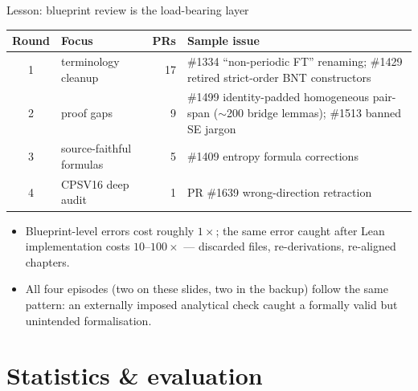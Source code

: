 \documentclass[aspectratio=169,10pt]{beamer}
\begin{document}
\begin{frame}{Lesson: blueprint review is the load-bearing layer}
    \vspace{-0.2em}
    \begin{center}
    \renewcommand{\arraystretch}{1.25}
    {\footnotesize
    \begin{tabular}{@{}c l r l@{}}
        \toprule
        \textbf{Round} & \textbf{Focus} & \textbf{PRs} & \textbf{Sample issue} \\
        \midrule
        1 & terminology cleanup       & 17 & \#1334 ``non-periodic FT'' renaming; \#1429 retired strict-order BNT constructors \\
        2 & proof gaps                & 9  & \#1499 identity-padded homogeneous pair-span ($\sim$200 bridge lemmas); \#1513 banned SE jargon \\
        3 & source-faithful formulas  & 5  & \#1409 entropy formula corrections \\
        4 & CPSV16 deep audit         & 1  & PR \#1639 wrong-direction retraction \\
        \bottomrule
    \end{tabular}}
    \end{center}
    \vspace{0.5em}
    \begin{itemize}
        \item Blueprint-level errors cost roughly $1\!\times$; the same error caught after Lean implementation costs $10$--$100\times$ --- discarded files, re-derivations, re-aligned chapters.
        \item All four episodes (two on these slides, two in the backup) follow the same pattern: an externally imposed analytical check caught a formally valid but unintended formalisation.
    \end{itemize}
\end{frame}

\section{Statistics \& evaluation}
\end{document}
